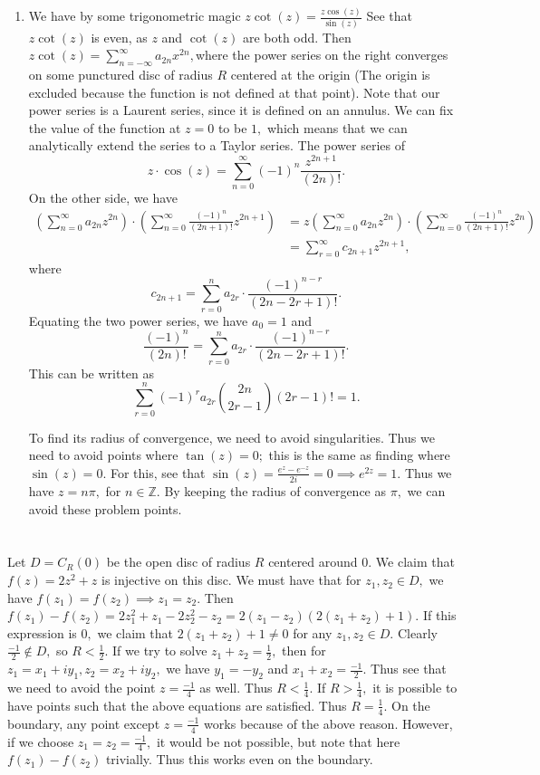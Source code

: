 \documentclass{article}
\begin{document}
\begin{enumerate}
\item We have by some trigonometric magic $z \cot(z) = \frac{z \cos (z)}{\sin (z)}$  See that 
$z \cot (z)$ is even, as $z$ and $\cot(z)$ are both odd. Then $z\cot (z)= \sum_{n=-\infty}^{\infty} a_{2n}{x^{2n}},$where the power series on the right 
converges on some punctured disc of radius $R$ centered at the origin (The origin is excluded because the function is not defined at that point). Note that 
our power series is a Laurent series, since it is defined on an annulus.  We can fix the value of the function at $z=0$ to be $1,$ which means that we can 
analytically extend the series to a Taylor series. The power 
series of $$z \cdot \cos (z)= \sum_{n=0}^{\infty} (-1)^n \frac{z^{2n+1}}{(2n)!}.$$ On the 
other side, we have 
\begin{align*}
	\left(\sum_{n=0}^{\infty}a_{2n} z^{2n}\right) \cdot \left(\sum_{n=0}^{\infty} \frac{(-1)^n}{(2n+1)!}z^{2n+1}\right) &= z 
	\left(\sum_{n=0}^{\infty}a_{2n} z^{2n}\right) \cdot \left(\sum_{n=0}^{\infty} \frac{(-1)^n}{(2n+1)!}z^{2n}\right)\\
	&= \sum_{r=0}^{\infty} c_{2n+1} z^{2n+1}, 
\end{align*}
where $$c_{2n+1}= \sum_{r=0}^{n} a_{2r}\cdot \frac{(-1)^{n-r}}{(2n-2r+1)!}.$$ Equating the two power series, we have $a_0=1$ and $$\frac{(-1)^n}{(2n)!} =  
\sum_{r=0}^{n} a_{2r}\cdot \frac{(-1)^{n-r}}{(2n-2r+1)!}. $$ This can be written as $$\sum_{r=0}^n (-1)^r a_{2r}  \binom{2n}{2r-1} (2r-1)! =1.$$

To find its radius of convergence, we need to avoid singularities. Thus we need to avoid points where $\tan (z)=0;$ this is the same as finding where $\sin 
(z)=0.$ For this, see that $\sin (z) = \frac{e^z - e^{-z}}{2i}=0 \implies e^{2z}=1.$ Thus we have $z= n \pi,$ for $n \in \mathbb{Z}.$ By keeping the radius 
of convergence as $\pi,$ we can avoid these problem points.  
\end{enumerate}
\section{} %
Let $D=C_R(0)$ be the open disc of radius $R$ centered around $0.$ We claim that $f(z)=2z^2+z$ is injective on this disc. We must have that for $z_1,z_2 \in 
D,$ we have $f(z_1)=f(z_2) \implies z_1=z_2.$ Then $f(z_1)-f(z_2)= 2z_1^2+z_1 - 2z_2^2 - z_2 = 2(z_1-z_2)(2(z_1+z_2)+1).$ If this expression is $0,$ we 
claim that $2(z_1+z_2)+1 \neq 0$ for any $z_1, z_2 \in D.$ Clearly $\frac{-1}{2} \notin D,$ so $R < \frac{1}{2}.$ If we try to solve $z_1+z_2=\frac{1}{2},$ 
then for $z_1=x_1+iy_1, z_2=x_2+iy_2,$ we have $y_1=-y_2$ and $x_1+x_2=\frac{-1}{2}.$ Thus see that we need to avoid the point $z=\frac{-1}{4}$ as well. 
Thus $R < \frac{1}{4}.$ If $R>\frac{1}{4},$ it is possible to have points such that the above equations are satisfied. Thus $R=\frac{1}{4}.$ On the 
boundary, any point except $z=\frac{-1}{4}$ works because of the above reason. However, if we choose $z_1=z_2=\frac{-1}{4},$ it would be not possible, but 
note that here $f(z_1)-f(z_2)$ trivially. Thus this works even on the boundary.  
\end{document}
